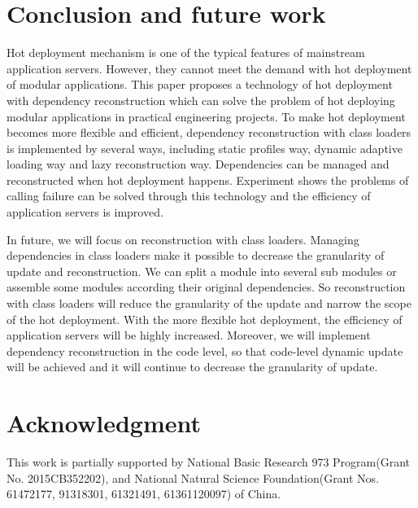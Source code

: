 \documentclass[conference]{IEEEtran}
\begin{document}
\section{Conclusion and future work\label{sec:conclusion}}
Hot deployment mechanism is one of the typical features of mainstream application servers.
However, they cannot meet the demand with hot deployment of modular applications.
This paper proposes a technology of hot deployment with dependency reconstruction which can solve the problem of hot deploying modular applications in practical engineering projects.
To make hot deployment becomes more flexible and efficient, dependency reconstruction with class loaders is implemented by several ways, including static profiles way, dynamic adaptive loading way and lazy reconstruction way.
Dependencies can be managed and reconstructed when hot deployment happens.
Experiment shows the problems of calling failure can be solved through this technology and the efficiency of application servers is improved.

In future, we will focus on reconstruction with class loaders.
Managing dependencies in class loaders make it possible to decrease the granularity of update and reconstruction.
We can split a module into several sub modules or assemble some modules according their original dependencies.
So reconstruction with class loaders will reduce the granularity of the update and narrow the scope of the hot deployment.
With the more flexible hot deployment, the efficiency of application servers will be highly increased.
Moreover, we will implement dependency reconstruction in the code level\cite{future_Gu}, so that code-level dynamic update will be achieved and it will continue to decrease the granularity of update.

\section*{Acknowledgment}
This work is partially supported by National Basic Research 973 Program(Grant No. 2015CB352202), and National Natural Science Foundation(Grant Nos. 61472177, 91318301, 61321491, 61361120097) of China.

\end{document}

